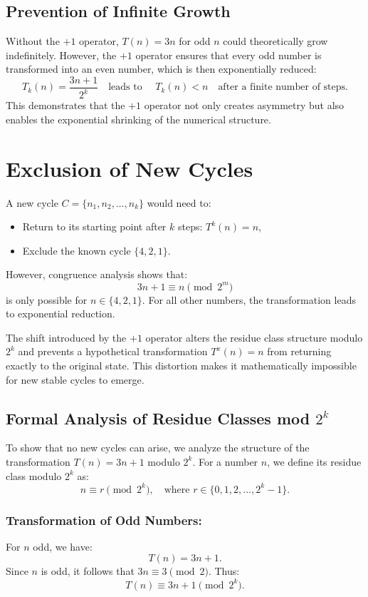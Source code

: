 \documentclass[a4paper,12pt]{article}
\begin{document}
\subsection{Prevention of Infinite Growth}
Without the \(+1\) operator, \( T(n) = 3n \) for odd \( n \) could theoretically grow indefinitely. However, the \(+1\) operator ensures that every odd number is transformed into an even number, which is then exponentially reduced:
\[
T_k(n) = \frac{3n + 1}{2^k} \quad \text{leads to } \quad T_k(n) < n \quad \text{after a finite number of steps}.
\]
This demonstrates that the \(+1\) operator not only creates asymmetry but also enables the exponential shrinking of the numerical structure.

\section{Exclusion of New Cycles}
A new cycle \( C = \{n_1, n_2, \dots, n_k\} \) would need to:
\begin{itemize}
    \item Return to its starting point after \( k \) steps: \( T^k(n) = n \),
    \item Exclude the known cycle \( \{4, 2, 1\} \).
\end{itemize}

However, congruence analysis shows that:
\[
3n + 1 \equiv n \pmod{2^m}
\]
is only possible for \( n \in \{4, 2, 1\} \). For all other numbers, the transformation leads to exponential reduction.

The shift introduced by the \(+1\) operator alters the residue class structure modulo \( 2^k \) and prevents a hypothetical transformation \( T^x(n) = n \) from returning exactly to the original state. This distortion makes it mathematically impossible for new stable cycles to emerge.

\subsection{Formal Analysis of Residue Classes mod \( 2^k \)}
To show that no new cycles can arise, we analyze the structure of the transformation \( T(n) = 3n + 1 \) modulo \( 2^k \). For a number \( n \), we define its residue class modulo \( 2^k \) as:
\[
n \equiv r \pmod{2^k}, \quad \text{where } r \in \{0, 1, 2, \dots, 2^k - 1\}.
\]

\subsubsection{Transformation of Odd Numbers:}
   For \( n \) odd, we have:
   \[
   T(n) = 3n + 1.
   \]
   Since \( n \) is odd, it follows that \( 3n \equiv 3 \pmod{2} \). Thus:
   \[
   T(n) \equiv 3n + 1 \pmod{2^k}.
   \]
\end{document}
